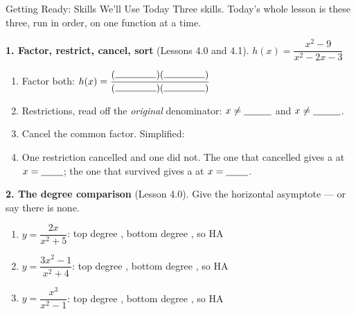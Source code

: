\documentclass[10pt]{article}
\begin{document}
\namedateperiod

\vspace{0.10in}

\begin{notesbox}{Getting Ready: Skills We'll Use Today}
\small Three skills. Today's whole lesson is these three, run in order, on one function at a time.

\vspace{4pt}
\textbf{1. Factor, restrict, cancel, sort} (Lessons 4.0 and 4.1). \; $h(x)=\dfrac{x^2-9}{x^2-2x-3}$
\begin{enumerate}[label=(\alph*), leftmargin=2.1em, itemsep=3pt]
  \item Factor both: \; $h(x)=\dfrac{(\rule{1.5cm}{0.4pt})(\rule{1.5cm}{0.4pt})}%
        {(\rule{1.5cm}{0.4pt})(\rule{1.5cm}{0.4pt})}$
  \item Restrictions, read off the \emph{original} denominator: $x\neq\blank{1.0cm}$ and
        $x\neq\blank{1.0cm}$.
  \item Cancel the common factor. Simplified: \blank{2.4cm}
  \item One restriction cancelled and one did not. The one that cancelled gives a
        \blank{1.6cm} at $x=\blank{0.8cm}$; the one that survived gives a \blank{3.4cm} at
        $x=\blank{0.8cm}$.
\end{enumerate}

\vspace{4pt}
\textbf{2. The degree comparison} (Lesson 4.0). Give the horizontal asymptote --- or say there is none.
\begin{enumerate}[label=(\alph*), leftmargin=2.1em, itemsep=3pt]
  \item $y=\dfrac{2x}{x^2+5}$: \; top degree \blank{0.7cm}, bottom degree \blank{0.7cm}, so
        HA \blank{1.6cm}
  \item $y=\dfrac{3x^2-1}{x^2+4}$: \; top degree \blank{0.7cm}, bottom degree \blank{0.7cm}, so
        HA \blank{1.6cm}
  \item $y=\dfrac{x^3}{x^2-1}$: \; top degree \blank{0.7cm}, bottom degree \blank{0.7cm}, so
        HA \blank{1.6cm}
\end{enumerate}


\end{notesbox}
\end{document}

